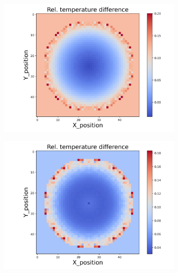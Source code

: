 \begin{figure}[h]
\begin{minipage}{\textwidth}
\begin{subfigure}{0.325\textwidth}
        \end{subfigure}
        \begin{subfigure}{0.325\textwidth}
            \centering
            \includegraphics[width=\textwidth]{figures/raw_data/23/exp/T_bias.jpg}
        \end{subfigure}
        \begin{subfigure}{0.325\textwidth}
            \centering
            \includegraphics[width=\textwidth]{figures/raw_data/24/exp/T_bias.jpg}
        \end{subfigure}
    \end{minipage}\\

\end{figure}
